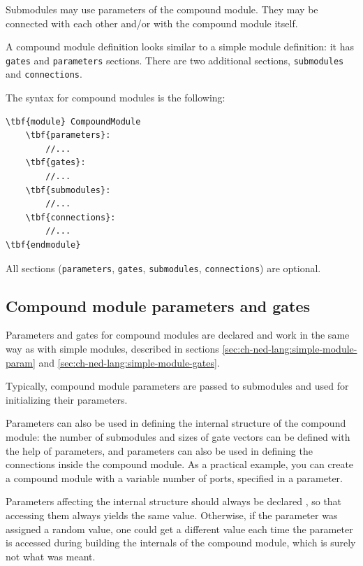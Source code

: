 Submodules may use parameters of the compound module.
They may be connected with each other and/or with
the compound module itself.

A compound module definition looks
similar to a simple module definition:
it has \texttt{gates} and \texttt{parameters} sections.
There are two additional sections, \texttt{submodules} and
\texttt{connections}.

The syntax for compound modules is the following:

\begin{Verbatim}[commandchars=\\\{\}]
\tbf{module} CompoundModule
    \tbf{parameters}:
        //...
    \tbf{gates}:
        //...
    \tbf{submodules}:
        //...
    \tbf{connections}:
        //...
\tbf{endmodule}
\end{Verbatim}

All sections (\texttt{parameters}, \texttt{gates}, \texttt{submodules},
\texttt{connections}) are optional.



\subsection{Compound module parameters and gates}

Parameters and gates 
for compound modules are declared and work in the same way
as with simple modules, described in sections
\ref{sec:ch-ned-lang:simple-module-param}
and \ref{sec:ch-ned-lang:simple-module-gates}.

Typically, compound module parameters are passed to submodules and
used for initializing their parameters.

Parameters can also be used in defining the internal structure of
the compound module: the number of submodules and sizes of gate vectors
can be defined with the help of parameters, and parameters can
also be used in defining the connections inside the compound module.
As a practical example, you can create a  compound module
with a variable number of ports, specified in a  parameter.

Parameters affecting the internal structure should always be declared
, so that accessing them always yields the same value.
Otherwise, if the parameter was assigned a random value, one could
get a different value each time the parameter is accessed during building
the internals of the compound module, which is surely not what was meant.

